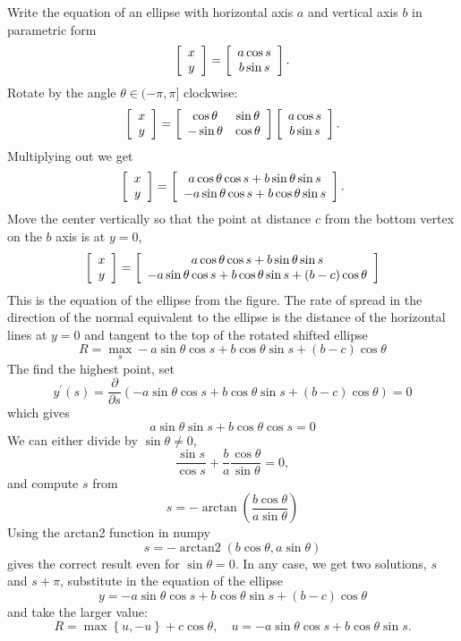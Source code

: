 \documentclass{article}
\begin{document}
Write the equation of an ellipse with horizontal axis $a$ and vertical axis
$b$ in parametric form
$$
\left[
\begin{array}
[c]{c}
x\\
y
\end{array}
\right]  =\left[
\begin{array}
[c]{c}
a\cos s\\
b\sin s
\end{array}
\right] .
$$
Rotate by the angle $\theta\in(-\pi,\pi]$ clockwise:
$$
\left[
\begin{array}
[c]{c}
x\\
y
\end{array}
\right]  =\left[
\begin{array}
[c]{cc}
\cos\theta & \sin\theta\\
-\sin\theta & \cos\theta
\end{array}
\right]  \left[
\begin{array}
[c]{c}
a\cos s\\
b\sin s
\end{array}
\right]  .
$$
Multiplying out we get
$$
\left[
\begin{array}
[c]{c}
x\\
y
\end{array}
\right]  =\left[
\begin{array}
[c]{c}
a\cos\theta\cos s+b\sin\theta\sin s\\
-a\sin\theta\cos s+b\cos\theta\sin s
\end{array}
\right]  .
$$
Move the center vertically so that the point at distance $c$ from the bottom
vertex on the $b$ axis is at $y=0$,
$$
\left[
\begin{array}
[c]{c}
x\\
y
\end{array}
\right]  =\left[
\begin{array}
[c]{c}
a\cos\theta\cos s+b\sin\theta\sin s\\
-a\sin\theta\cos s+b\cos\theta\sin s+(b-c)\cos\theta
\end{array}
\right]
$$
This is the equation of the ellipse from the figure. The rate of spread in the
direction of the normal equivalent to the ellipse is the distance of the
horizontal lines at $y=0$ and tangent to the top of the rotated shifted
ellipse
$$
R=\max_{s}-a\sin\theta\cos s+b\cos\theta\sin s+(b-c)\cos\theta
$$
The find the highest point, set
$$
y^{\prime}\left(  s\right)  =\frac{\partial}{\partial s}\left(  -a\sin
\theta\cos s+b\cos\theta\sin s+(b-c)\cos\theta\right)  =0
$$
which gives
$$
a\sin\theta\sin s+b\cos\theta\cos s=0
$$
We can either divide by $\sin\theta\neq0$,
$$
\frac{\sin s}{\cos s}+\frac{b}{a}\frac{\cos\theta}{\sin\theta}=0,
$$
and compute $s$ from
$$
s=-\arctan\left(  \frac{b\cos\theta}{a\sin\theta}\right)
$$
Using the arctan2 function in numpy
$$
s=-\mathop{arctan2}\left(  b\cos\theta,a\sin\theta\right)
$$
gives the correct result even for $\sin\theta=0.$ In any case, we get two solutions, $s$
and $s+\pi$,  substitute in the equation of the ellipse
$$
y=-a\sin\theta\cos s+b\cos\theta\sin s+\left(  b-c\right)  \cos\theta
$$
and take the larger value:
$$
R=\max\left\{  u,-u\right\}  +c\cos\theta,\quad u=-a\sin\theta\cos
s+b\cos\theta\sin s.
$$
\end{document}
